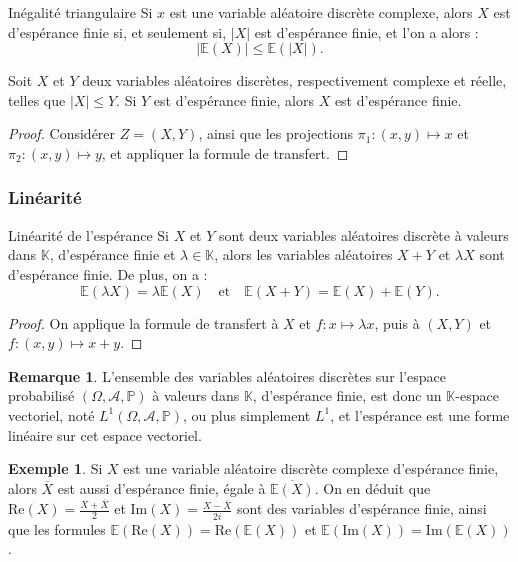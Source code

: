 \documentclass[french]{article}
\renewcommand{\P}{\mathbb{P}}
\newcommand{\K}{\mathbb{K}}
\newcommand{\E}{\mathbb{E}}
\theoremstyle{plain}
\theoremstyle{definition}
\newtheorem*{ex}{Exemple}
\newtheorem*{rmq}{Remarque}
\theoremstyle{remark}
\begin{document}
\begin{thm}{Inégalité triangulaire}%
	Si $x$ est une variable aléatoire discrète complexe, alors $X$ est d'espérance finie si, et seulement si, $\lvert X\rvert$ est d'espérance finie, et l'on a alors :
	$$\lvert\E(X)\rvert\leqslant\E(\lvert X\rvert).$$
\end{thm}

\begin{thm}{}%
	Soit $X$ et $Y$ deux variables aléatoires discrètes, respectivement complexe et réelle, telles que $\lvert X\rvert\leqslant Y$. Si $Y$ est d'espérance finie, alors $X$ est d'espérance finie.
\end{thm}
\begin{proof}
	Considérer $Z=(X,Y)$, ainsi que les projections $\pi_1:(x,y)\mapsto x$ et $\pi_2:(x,y)\mapsto y$, et appliquer la formule de transfert.
\end{proof}

\subsubsection*{Linéarité}

\begin{thm}{Linéarité de l'espérance}%
	Si $X$ et $Y$ sont deux variables aléatoires discrète à valeurs dans $\K$, d'espérance finie et $\lambda\in\K$, alors les variables aléatoires $X+Y$ et $\lambda X$ sont d'espérance finie. De plus, on a :
	$$\E(\lambda X)=\lambda\E(X)\quad\text{et}\quad\E(X+Y)=\E(X)+\E(Y).$$
\end{thm}
\begin{proof}
	On applique la formule de transfert à $X$ et $f:x\mapsto\lambda x$, puis à $(X,Y)$ et $f:(x,y)\mapsto x+y$.
\end{proof}

\begin{rmq}
	L'ensemble des variables aléatoires discrètes sur l'espace probabilisé $(\Omega,\mathcal{A},\P)$ à valeurs dans $\K$, d'espérance finie, est donc un $\K$-espace vectoriel, noté $L^1(\Omega,\mathcal{A},\P)$, ou plus simplement $L^1$, et l'espérance est une forme linéaire sur cet espace vectoriel.
\end{rmq}

\begin{ex}
	Si $X$ est une variable aléatoire discrète complexe d'espérance finie, alors $\overline{X}$ est aussi d'espérance finie, égale à $\overline{\E(X)}$. On en déduit que $\text{Re}(X)=\displaystyle\frac{X+\overline{X}}{2}$ et $\text{Im}(X)=\displaystyle\frac{X-\overline{X}}{2i}$ sont des variables d'espérance finie, ainsi que les formules $\E(\text{Re}(X))=\text{Re}(\E(X))$ et $\E(\text{Im}(X))=\text{Im}(\E(X))$.
\end{ex}
\end{document}
